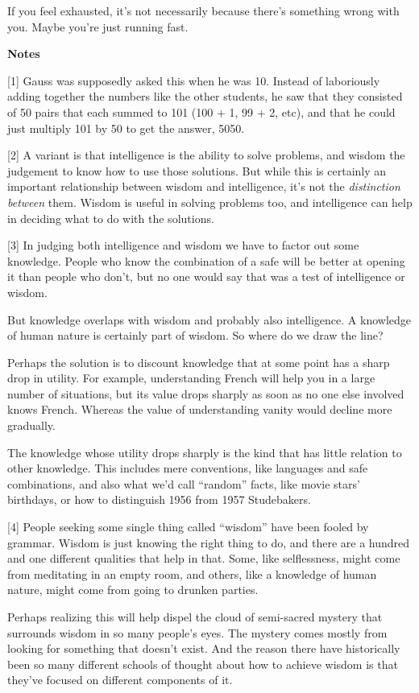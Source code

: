 If you feel exhausted, it's not necessarily because there's something
wrong with you. Maybe you're just running fast.

\textbf{Notes}

{[}1{]} Gauss was supposedly asked this when he was 10. Instead of
laboriously adding together the numbers like the other students, he saw
that they consisted of 50 pairs that each summed to 101 (100 + 1, 99 +
2, etc), and that he could just multiply 101 by 50 to get the answer,
5050.

{[}2{]} A variant is that intelligence is the ability to solve problems,
and wisdom the judgement to know how to use those solutions. But while
this is certainly an important relationship between wisdom and
intelligence, it's not the \emph{distinction between} them. Wisdom is
useful in solving problems too, and intelligence can help in deciding
what to do with the solutions.

{[}3{]} In judging both intelligence and wisdom we have to factor out
some knowledge. People who know the combination of a safe will be better
at opening it than people who don't, but no one would say that was a
test of intelligence or wisdom.

But knowledge overlaps with wisdom and probably also intelligence. A
knowledge of human nature is certainly part of wisdom. So where do we
draw the line?

Perhaps the solution is to discount knowledge that at some point has a
sharp drop in utility. For example, understanding French will help you
in a large number of situations, but its value drops sharply as soon as
no one else involved knows French. Whereas the value of understanding
vanity would decline more gradually.

The knowledge whose utility drops sharply is the kind that has little
relation to other knowledge. This includes mere conventions, like
languages and safe combinations, and also what we'd call ``random''
facts, like movie stars' birthdays, or how to distinguish 1956 from 1957
Studebakers.

{[}4{]} People seeking some single thing called ``wisdom'' have been
fooled by grammar. Wisdom is just knowing the right thing to do, and
there are a hundred and one different qualities that help in that. Some,
like selflessness, might come from meditating in an empty room, and
others, like a knowledge of human nature, might come from going to
drunken parties.

Perhaps realizing this will help dispel the cloud of semi-sacred mystery
that surrounds wisdom in so many people's eyes. The mystery comes mostly
from looking for something that doesn't exist. And the reason there have
historically been so many different schools of thought about how to
achieve wisdom is that they've focused on different components of it.

